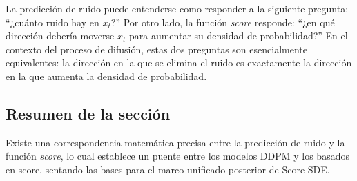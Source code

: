 La predicción de ruido puede entenderse como responder a la siguiente pregunta: ``¿cuánto ruido hay en $x_t$?'' Por otro lado, la función \textit{score} responde: ``¿en qué dirección debería moverse $x_t$ para aumentar su densidad de probabilidad?'' En el contexto del proceso de difusión, estas dos preguntas son esencialmente equivalentes: la dirección en la que se elimina el ruido es exactamente la dirección en la que aumenta la densidad de probabilidad.

\subsection{Resumen de la sección}

Existe una correspondencia matemática precisa entre la predicción de ruido y la función \textit{score}, lo cual establece un puente entre los modelos DDPM y los basados en score, sentando las bases para el marco unificado posterior de Score SDE.



